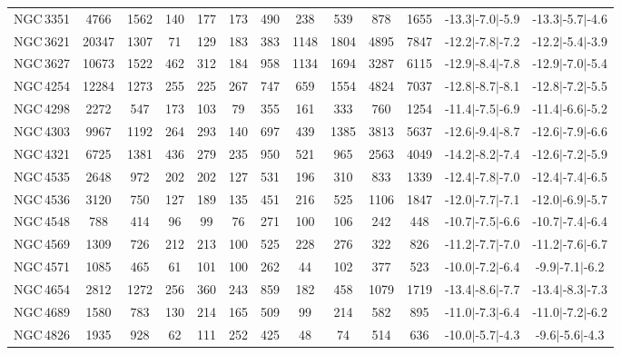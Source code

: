 \documentclass[linenumbers]{aastex63}
\begin{document}
\begin{table*}
\begin{center}
\begin{tabular}{lcccccccccccc}
NGC\,3351 & 4766 & 1562 & 140 & 177 & 173 & 490 & 238 & 539 & 878 & 1655 & -13.3$\vert$-7.0$\vert$-5.9 & -13.3$\vert$-5.7$\vert$-4.6 \\ 
NGC\,3621 & 20347 & 1307 & 71 & 129 & 183 & 383 & 1148 & 1804 & 4895 & 7847 & -12.2$\vert$-7.8$\vert$-7.2 & -12.2$\vert$-5.4$\vert$-3.9 \\ 
NGC\,3627 & 10673 & 1522 & 462 & 312 & 184 & 958 & 1134 & 1694 & 3287 & 6115 & -12.9$\vert$-8.4$\vert$-7.8 & -12.9$\vert$-7.0$\vert$-5.4 \\ 
NGC\,4254 & 12284 & 1273 & 255 & 225 & 267 & 747 & 659 & 1554 & 4824 & 7037 & -12.8$\vert$-8.7$\vert$-8.1 & -12.8$\vert$-7.2$\vert$-5.5 \\ 
NGC\,4298 & 2272 & 547 & 173 & 103 & 79 & 355 & 161 & 333 & 760 & 1254 & -11.4$\vert$-7.5$\vert$-6.9 & -11.4$\vert$-6.6$\vert$-5.2 \\ 
NGC\,4303 & 9967 & 1192 & 264 & 293 & 140 & 697 & 439 & 1385 & 3813 & 5637 & -12.6$\vert$-9.4$\vert$-8.7 & -12.6$\vert$-7.9$\vert$-6.6 \\ 
NGC\,4321 & 6725 & 1381 & 436 & 279 & 235 & 950 & 521 & 965 & 2563 & 4049 & -14.2$\vert$-8.2$\vert$-7.4 & -12.6$\vert$-7.2$\vert$-5.9 \\ 
NGC\,4535 & 2648 & 972 & 202 & 202 & 127 & 531 & 196 & 310 & 833 & 1339 & -12.4$\vert$-7.8$\vert$-7.0 & -12.4$\vert$-7.4$\vert$-6.5 \\ 
NGC\,4536 & 3120 & 750 & 127 & 189 & 135 & 451 & 216 & 525 & 1106 & 1847 & -12.0$\vert$-7.7$\vert$-7.1 & -12.0$\vert$-6.9$\vert$-5.7 \\ 
NGC\,4548 & 788 & 414 & 96 & 99 & 76 & 271 & 100 & 106 & 242 & 448 & -10.7$\vert$-7.5$\vert$-6.6 & -10.7$\vert$-7.4$\vert$-6.4 \\ 
NGC\,4569 & 1309 & 726 & 212 & 213 & 100 & 525 & 228 & 276 & 322 & 826 & -11.2$\vert$-7.7$\vert$-7.0 & -11.2$\vert$-7.6$\vert$-6.7 \\ 
NGC\,4571 & 1085 & 465 & 61 & 101 & 100 & 262 & 44 & 102 & 377 & 523 & -10.0$\vert$-7.2$\vert$-6.4 & -9.9$\vert$-7.1$\vert$-6.2 \\ 
NGC\,4654 & 2812 & 1272 & 256 & 360 & 243 & 859 & 182 & 458 & 1079 & 1719 & -13.4$\vert$-8.6$\vert$-7.7 & -13.4$\vert$-8.3$\vert$-7.3 \\ 
NGC\,4689 & 1580 & 783 & 130 & 214 & 165 & 509 & 99 & 214 & 582 & 895 & -11.0$\vert$-7.3$\vert$-6.4 & -11.0$\vert$-7.2$\vert$-6.2 \\ 
NGC\,4826 & 1935 & 928 & 62 & 111 & 252 & 425 & 48 & 74 & 514 & 636 & -10.0$\vert$-5.7$\vert$-4.3 & -9.6$\vert$-5.6$\vert$-4.3 \\ 

\end{tabular}
\end{center}
\end{table*}
\end{document}
